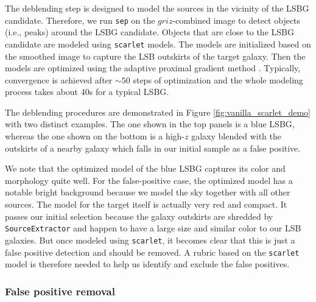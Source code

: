\documentclass[twocolumn,astrosymb,twocolappendix,linenumbers]{aastex631}
\newcommand{\code}[1]{\texttt{#1}}
\begin{document}
\begin{CJK*}{UTF8}{gbsn}
The deblending step is designed to model the sources in the vicinity of the LSBG candidate. Therefore, we run \code{sep} on the $griz$-combined image to detect objects (i.e., peaks) around the LSBG candidate. Objects that are close to the LSBG candidate are modeled using \code{scarlet} models. The models are initialized based on the smoothed image to capture the LSB outskirts of the target galaxy. Then the models are optimized using the adaptive proximal gradient method \citep{Melchior2019}. Typically, convergence is achieved after $\sim 50$ steps of optimization and the whole modeling process takes about 40s for a typical LSBG.

The deblending procedures are demonstrated in Figure \ref{fig:vanilla_scarlet_demo} with two distinct examples. The one shown in the top panels is a blue LSBG, whereas the one shown on the bottom is a high-$z$ galaxy blended with the outskirts of a nearby galaxy which falls in our initial sample as a false positive. %

We note that the optimized model of the blue LSBG captures its color and morphology quite well. For the false-positive case, the optimized model has a notable bright background because we model the sky together with all other sources. The model for the target itself is actually very red and compact. It passes our initial selection because the galaxy outskirts are shredded by \code{SourceExtractor} and happen to have a large size and similar color to our LSB galaxies. But once modeled using \code{scarlet}, it becomes clear that this is just a false positive detection and should be removed. A rubric based on the \code{scarlet} model is therefore needed to help us identify and exclude the false positives. 



\subsubsection{False positive removal}\label{sec:non-par-measurement}


\end{CJK*}
\end{document}

